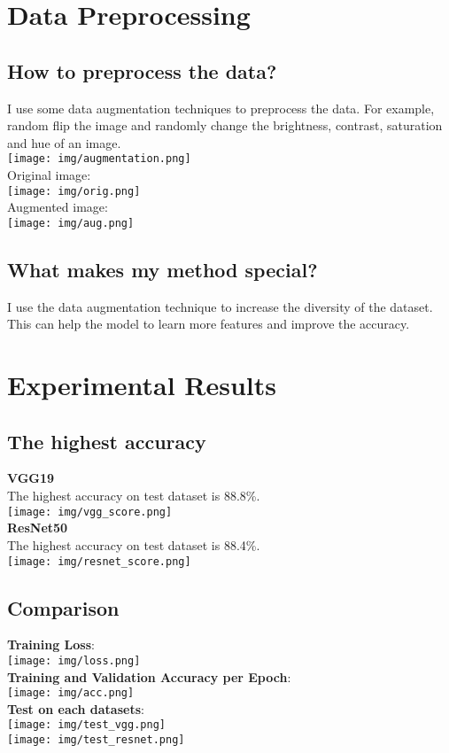 \documentclass{article} %
\begin{document}
    \section{Data Preprocessing}
    \subsection{How to preprocess the data?}
    I use some data augmentation techniques to preprocess the data. 
    For example, random flip the image and randomly change the brightness, contrast, saturation and hue of an image.\\
    \texttt{[image: img/augmentation.png]} \\
    Original image: \\
    \texttt{[image: img/orig.png]} \\
    Augmented image: \\
    \texttt{[image: img/aug.png]} \\
    \subsection{What makes my method special?}
    I use the data augmentation technique to increase the diversity of the dataset. 
    This can help the model to learn more features and improve the accuracy.

    \section{Experimental Results}
    \subsection{The highest accuracy}
    \textbf{VGG19} \\
    The highest accuracy on test dataset is 88.8\%. \\
    \texttt{[image: img/vgg\_score.png]} \\
    \textbf{ResNet50} \\
    The highest accuracy on test dataset is 88.4\%. \\
    \texttt{[image: img/resnet\_score.png]} \\
    \subsection{Comparison}
    \textbf{Training Loss}: \\
    \texttt{[image: img/loss.png]} \\
    \textbf{Training and Validation Accuracy per Epoch}: \\
    \texttt{[image: img/acc.png]} \\
    \textbf{Test on each datasets}: \\
    \texttt{[image: img/test\_vgg.png]} \\
    \texttt{[image: img/test\_resnet.png]} \\
\end{document}
